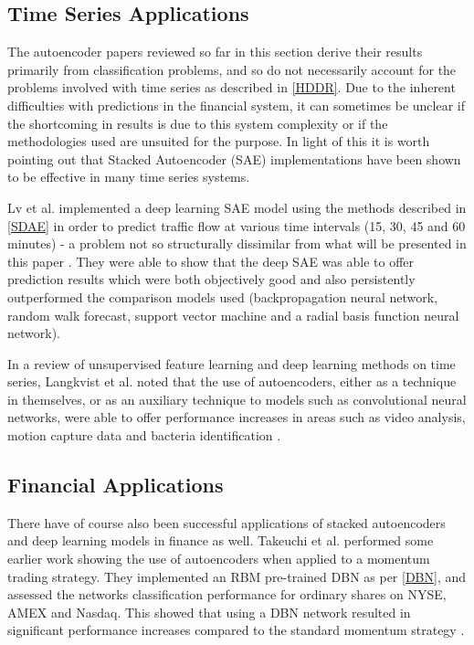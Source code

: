\documentclass[a4paper,latin]{paper}
\begin{document}
\subsection {Time Series Applications}

The autoencoder papers reviewed so far in this section derive their results primarily from classification problems, 
and so do not necessarily account for the problems involved with time series as described in \ref{HDDR}. Due to 
the inherent difficulties with predictions in the financial system, it can sometimes be unclear if the shortcoming in 
results is due to this system complexity or if the methodologies used are unsuited for the purpose. In light of this 
it is worth pointing out that Stacked Autoencoder (SAE) implementations have been shown to be effective in many
 time series systems.  
 \hfill \break 

Lv et al.  implemented a deep learning SAE model using the methods described in \ref{SDAE} in order to 
predict traffic flow at various time intervals (15, 30, 45 and 60 minutes) - a problem not so structurally dissimilar 
from what will be presented in this paper \cite{Lv}. They were able to show that the deep SAE was able to offer prediction 
results which were both objectively good and also persistently outperformed the comparison models used 
(backpropagation neural network, random walk forecast, support vector machine and a radial basis function 
neural network).
\hfill \break 

In a review of unsupervised feature learning and deep learning methods on time series, Langkvist et al. noted that 
the use of autoencoders, either as a technique in themselves, or as an auxiliary technique to models 
such as convolutional neural networks, were able to offer performance increases in areas such as video analysis, 
motion capture data and bacteria identification \cite{Langkvist}.
 
\subsection{Financial Applications}

There have of course also been successful applications of stacked autoencoders and deep learning models in 
finance as well. Takeuchi et al. performed some earlier work showing the use of autoencoders when applied to a 
momentum trading strategy. They implemented an RBM pre-trained DBN as per \ref{DBN}, and assessed the 
networks classification performance for ordinary shares on NYSE, AMEX and Nasdaq. This showed that using a 
DBN network resulted in significant performance increases compared to the standard momentum strategy \cite{Takeuchi}.
\hfill \break 
\end{document}
